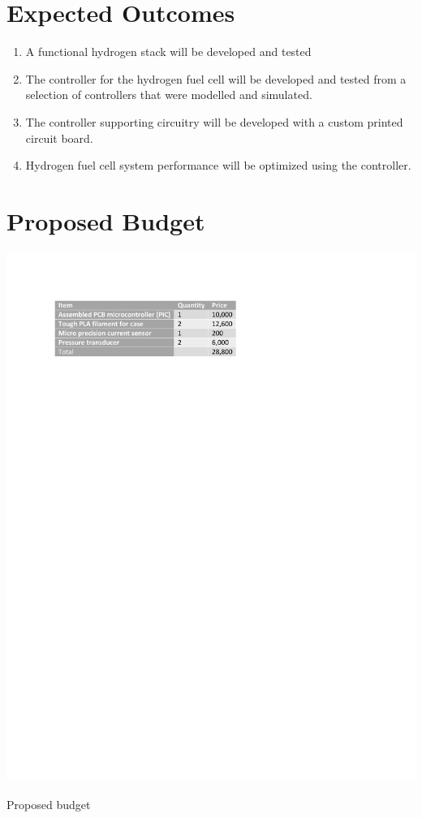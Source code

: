 \section{Expected Outcomes}
\begin{enumerate}
\item A functional hydrogen stack will be developed and tested
\item The controller for the hydrogen fuel cell will be developed and tested from a selection of controllers that were modelled and simulated.
\item The controller supporting circuitry will be developed with a custom printed circuit board.
\item Hydrogen fuel cell system performance will be optimized using the controller.
\end{enumerate}
\newpage
\section{Proposed Budget}
\begin{table}[!h]
\includegraphics{Figures/budget}
\caption{Proposed budget}
\end{table}

